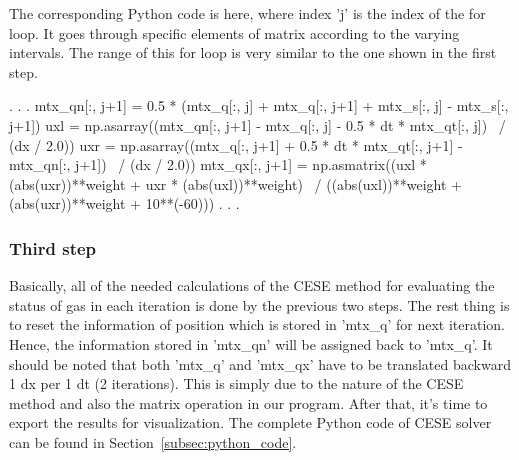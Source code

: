 \documentclass[a4paper,12pt,dvips]{article}
\begin{document}
The corresponding Python code is here, where index 'j' is the index of the for 
loop. It goes through specific elements of matrix according to the varying
intervals. The range of this for loop is very similar to the one shown in the 
first step.
\begin{pythonNoIndex}
                            .
                            .
                            .
        mtx_qn[:, j+1] = 0.5 * (mtx_q[:, j] + mtx_q[:, j+1] + mtx_s[:, j] - mtx_s[:, j+1])
        uxl = np.asarray((mtx_qn[:, j+1] - mtx_q[:, j] - 0.5 * dt * mtx_qt[:, j]) \
                                                                    / (dx / 2.0))
        uxr = np.asarray((mtx_q[:, j+1] + 0.5 * dt * mtx_qt[:, j+1] - mtx_qn[:, j+1]) \
                                                                        / (dx / 2.0))
        mtx_qx[:, j+1] = np.asmatrix((uxl * (abs(uxr))**weight + uxr * (abs(uxl))**weight) \
                                      / ((abs(uxl))**weight + (abs(uxr))**weight + 10**(-60)))
                            .
                            .
                            .
\end{pythonNoIndex}

\subsubsection{Third step}
 \label{subsubsec:third_step}
Basically, all of the needed calculations of the CESE method for evaluating the 
status of gas in each iteration is done by the previous two steps.
The rest thing is to reset the information of position which is stored in 
'mtx\_q' for next iteration.
Hence, the information stored in 'mtx\_qn' will be assigned back to 'mtx\_q'.
It should be noted that both 'mtx\_q' and 'mtx\_qx' have to be translated 
backward 1 dx per 1 dt (2 iterations). 
This is simply due to the nature of the CESE method and also the matrix operation 
in our program. After that, it's time to export the results for visualization.
The complete Python code of CESE solver can be found in 
Section~\ref{subsec:python_code}.
\end{document}
